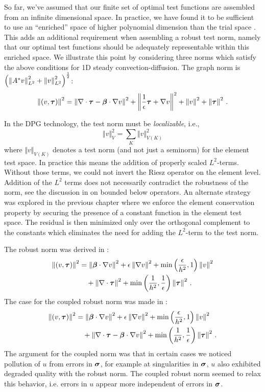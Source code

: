 \documentclass[Dissertation.tex]{subfiles}
\begin{document}
So far, we've assumed that our finite set of optimal test functions are assembled from an infinite dimensional space.
In practice, we have found it to be sufficient to use an ``enriched'' space of higher
polynomial dimension than the trial space \cite{PracticalDPG}.
This adds an additional requirement when assembling a robust test norm, namely that our optimal test functions should be adequately representable within this enriched space.
We illustrate this point by considering three norms which satisfy the above conditions for 1D steady convection-diffusion.
The graph norm is $\left( \left\| A^*v \right\|_{L^2}^2+\left\| v \right\|_{L^2}^2 \right)^{\frac{1}{2}}$:
\begin{equation*}
\left\| (v,\boldsymbol\tau) \right\|^2=
\left\| \nabla\cdot\boldsymbol\tau-\boldsymbol\beta\cdot\nabla v \right\|^2
+\left\| \frac{1}{\epsilon}\boldsymbol\tau+\nabla v \right\|^2
+\left\| v \right\|^2
+\left\| \boldsymbol\tau \right\|^2\,.
\end{equation*}
\begin{remark}
In the DPG technology, the test norm must be {\em localizable}, i.e.,
$$
\Vert v \Vert^2_{V} = \sum_{K} \Vert v \Vert^2_{V(K)}
$$
where $\Vert v \Vert_{V(K)}$ denotes a test norm (and not just a seminorm) for the
element test space. In practice this means the addition of properly scaled $L^2$-terms.
Without those terms, we could not invert the Riesz operator on the element level.
Addition of the $L^2$ terms does not necessarily contradict the robustness of the norm,
see the discussion in \cite{DPGEncyclopedia} on bounded below operators. An alternate
strategy was explored in the previous chapter where we enforce the element conservation
property 
by securing the presence of a constant function in the element test space. The residual
is then minimized only over the orthogonal complement to the constants which eliminates
the need for adding the $L^2$-term to the test norm.
\end{remark}
The robust norm was derived in \cite{ChanHeuerThanhDemkowicz2012}:
\begin{align*}
\left\| (v,\boldsymbol\tau) \right\|^2&=
\left\| \boldsymbol\beta\cdot\nabla v \right\|^2
+\epsilon\left\| \nabla v \right\|^2
+\min\left( \frac{\epsilon}{h^2},1 \right)\left\| v \right\|^2
\\&\quad
+\left\| \nabla\cdot\boldsymbol\tau \right\|^2
+\min\left( \frac{1}{h^2},\frac{1}{\epsilon} \right)\left\| \boldsymbol\tau \right\|^2\,.
\end{align*}
The case for the coupled robust norm was made in \cite{JesseDissertation}:
\begin{align*}
\left\| (v,\boldsymbol\tau) \right\|^2&=
\left\| \boldsymbol\beta\cdot\nabla v \right\|^2
+\epsilon\left\| \nabla v \right\|^2
+\min\left( \frac{\epsilon}{h^2},1 \right)\left\| v \right\|^2
\\&\quad
+\left\| \nabla\cdot\boldsymbol\tau-\boldsymbol\beta\cdot\nabla v \right\|^2
+\min\left( \frac{1}{h^2},\frac{1}{\epsilon} \right)\left\| \boldsymbol\tau \right\|^2\,.
\end{align*}
The argument for the coupled norm was that in certain cases we noticed pollution of $u$ from errors in $\boldsymbol\sigma$,
for example at singularities in $\boldsymbol\sigma$, $u$ also exhibited degraded quality with the robust norm. 
The coupled robust norm seemed to relax this behavior, i.e. errors in $u$ appear more independent of errors in $\boldsymbol\sigma$.
\end{document}
